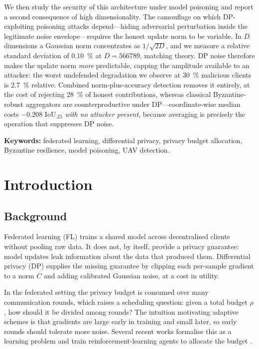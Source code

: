 We then study the security of this architecture under model poisoning and report
a second consequence of high dimensionality. The camouflage on which
DP-exploiting poisoning attacks depend---hiding adversarial perturbation inside
the legitimate noise envelope---requires the honest update norm to be variable.
In $D$ dimensions a Gaussian norm concentrates as $1/\sqrt{2D}$, and we measure a
relative standard deviation of \SI{0.10}{\percent} at $D=\num{566789}$, matching
theory. DP noise therefore makes the update norm \emph{more} predictable, capping
the amplitude available to an attacker: the worst undefended degradation we
observe at \SI{30}{\percent} malicious clients is \SI{2.7}{\percent} relative.
Combined norm-plus-accuracy detection removes it entirely, at the cost of
rejecting \SI{28}{\percent} of honest contributions, whereas classical
Byzantine-robust aggregators are counterproductive under DP---coordinate-wise
median costs $-0.208$ IoU$_{.25}$ \emph{with no attacker present}, because
averaging is precisely the operation that suppresses DP noise.

\textbf{Keywords:} federated learning, differential privacy, privacy budget
allocation, Byzantine resilience, model poisoning, UAV detection.


\chapter{Introduction}

\section{Background}

Federated learning (FL) trains a shared model across decentralised clients
without pooling raw data. It does not, by itself, provide a privacy guarantee:
model updates leak information about the data that produced them. Differential
privacy (DP) supplies the missing guarantee by clipping each per-sample gradient
to a norm $C$ and adding calibrated Gaussian noise, at a cost in utility.

In the federated setting the privacy budget is consumed over many communication
rounds, which raises a scheduling question: given a total budget $\rho$, how
should it be divided among rounds? The intuition motivating adaptive schemes is
that gradients are large early in training and small later, so early rounds
should tolerate more noise. Several recent works formalise this as a learning
problem and train reinforcement-learning agents to allocate the budget
\citep{chen2024adaptive}.

